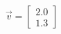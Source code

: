 \documentclass[preview]{standalone}
\begin{document}
\begin{align*}
\vec{v}=\begin{bmatrix}2.0\\1.3\end{bmatrix}
\end{align*}
\end{document}
